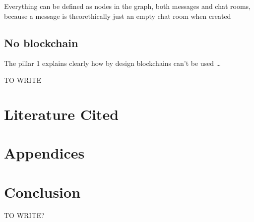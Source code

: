 \documentclass[12pt]{article}
\begin{document}
Everything can be defined as nodes in the graph, both messages and chat rooms, because a message is theorethically just an empty chat room when created











\subsection{No blockchain}

The pillar 1 explains clearly how by design blockchains can't be used \dots

TO WRITE

\section{Literature Cited}

\section{Appendices}

\section{Conclusion}
TO WRITE?
\end{document}
